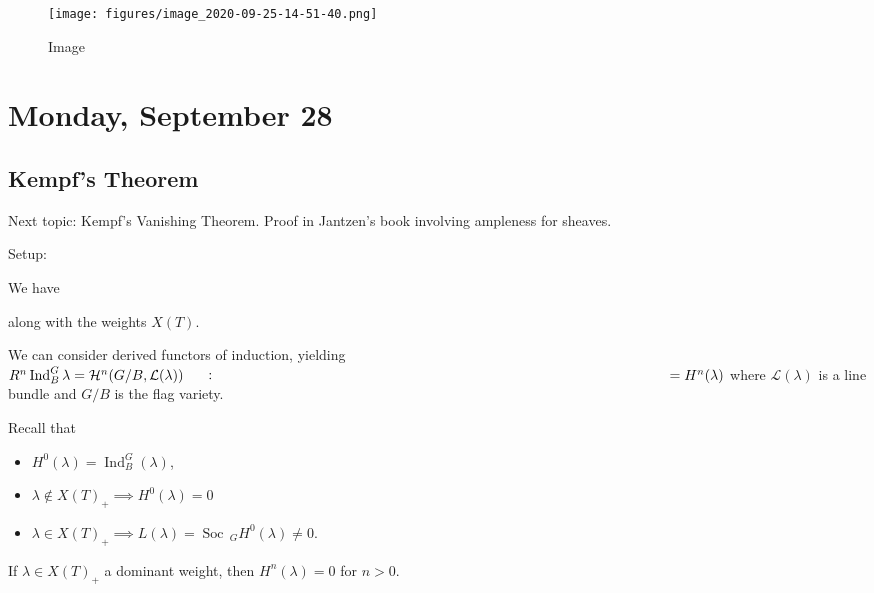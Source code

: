 \begin{figure}
\centering
\texttt{[image: figures/image\_2020-09-25-14-51-40.png]}
\caption{Image}
\end{figure}

\hypertarget{monday-september-28}{%
\section{Monday, September 28}\label{monday-september-28}}

\hypertarget{kempfs-theorem}{%
\subsection{Kempf's Theorem}\label{kempfs-theorem}}

Next topic: Kempf's Vanishing Theorem. Proof in Jantzen's book involving
ampleness for sheaves.

Setup:

We have

\begin{center}
\end{center}

along with the weights \(X(T)\).

We can consider derived functors of induction, yielding
\(R^n \operatorname{Ind}_B^G \lambda = \mathcal{H}^n(G/B, \mathcal{L}(\lambda)) \mathrel{\vcenter{:}}= H^n(\lambda)\)
where \(\mathcal{L}(\lambda)\) is a line bundle and \(G/B\) is the flag
variety.

Recall that

\begin{itemize}
\tightlist
\item
  \(H^0(\lambda) = \operatorname{Ind}_B^G(\lambda)\),
\item
  \(\lambda \not\in X(T)_+ \implies H^0(\lambda) = 0\)
\item
  \(\lambda \in X(T)_+ \implies L(\lambda) = \operatorname{Soc}\,_G H^0(\lambda) \neq 0\).
\end{itemize}

\begin{theorem}[Kempf]

\begin{theorem}[Kempf]

If \(\lambda \in X(T)_+\) a dominant weight, then \(H^n(\lambda) = 0\)
for \(n> 0\).

\end{theorem}

\end{theorem}

